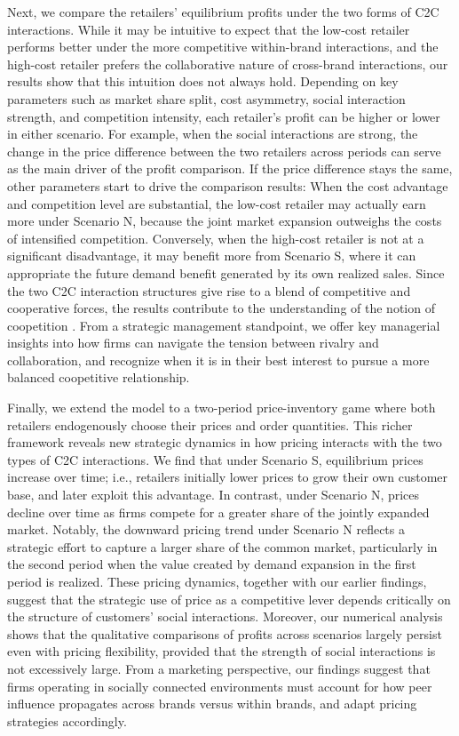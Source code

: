 \documentclass[nonblindrev,copyedit]{informs1}
\begin{document}
Next, we compare the retailers' equilibrium profits under the two forms of C2C interactions. While it may be intuitive to expect that the low-cost retailer performs better under the more competitive within-brand interactions, and the high-cost retailer prefers the collaborative nature of cross-brand interactions, our results show that this intuition does not always hold. Depending on key parameters such as market share split, cost asymmetry, social interaction strength, and competition intensity, each retailer’s profit can be higher or lower in either scenario.
For example, when the social interactions are strong, the change in the price difference between the two retailers across periods can serve as the main driver of the profit comparison. If the price difference stays the same, other parameters start to drive the comparison results:
When the cost advantage and competition level are substantial, the low-cost retailer may actually earn more under Scenario N, because the joint market expansion outweighs the costs of intensified competition. Conversely, when the high-cost retailer is not at a significant disadvantage, it may benefit more from Scenario S, where it can appropriate the future demand benefit generated by its own realized sales. Since the two C2C interaction structures give rise to a blend of competitive and cooperative forces, the results contribute to the understanding of the notion of coopetition \citep{coop1996,coop2001}. From a strategic management standpoint, we offer key managerial insights into how firms can navigate the tension between rivalry and collaboration, and recognize when it is in their best interest to pursue a more balanced coopetitive relationship.

Finally, we extend the model to a two-period price-inventory game where both retailers endogenously choose their prices and order quantities. This richer framework reveals new strategic dynamics in how pricing interacts with the two types of C2C interactions. We find that under Scenario S, equilibrium prices increase over time; i.e., retailers initially lower prices to grow their own customer base, and later exploit this advantage. In contrast, under Scenario N, prices decline over time as firms compete for a greater share of the jointly expanded market. Notably, the downward pricing trend under Scenario N reflects a strategic effort to capture a larger share of the common market, particularly in the second period when the value created by demand expansion in the first period is realized. These pricing dynamics, together with our earlier findings, suggest that the strategic use of price as a competitive lever depends critically on the structure of customers' social interactions. Moreover, our numerical analysis shows that the qualitative comparisons of profits across scenarios largely persist even with pricing flexibility, provided that the strength of social interactions is not excessively large.
From a marketing perspective, our findings suggest that firms operating in socially connected environments must account for how peer influence propagates across brands versus within brands, and adapt pricing strategies accordingly.
\end{document}
